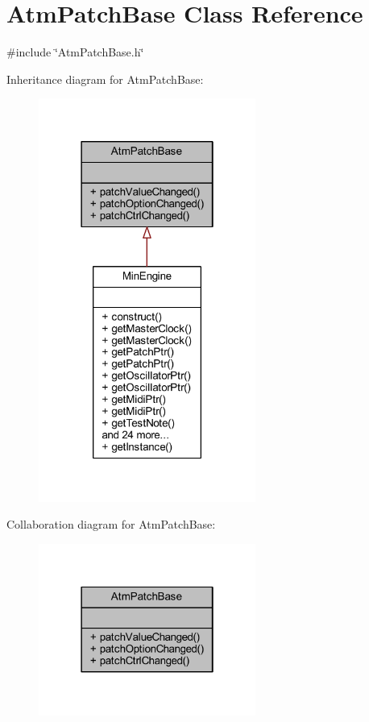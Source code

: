 \hypertarget{class_atm_patch_base}{}\section{Atm\+Patch\+Base Class Reference}
\label{class_atm_patch_base}


{\ttfamily \#include \char`\"{}Atm\+Patch\+Base.\+h\char`\"{}}



Inheritance diagram for Atm\+Patch\+Base\+:
\nopagebreak
\begin{figure}[H]
\begin{center}
\leavevmode
\includegraphics[width=202pt]{de/dc5/class_atm_patch_base__inherit__graph}
\end{center}
\end{figure}


Collaboration diagram for Atm\+Patch\+Base\+:
\nopagebreak
\begin{figure}[H]
\begin{center}
\leavevmode
\includegraphics[width=202pt]{dc/de3/class_atm_patch_base__coll__graph}
\end{center}
\end{figure}
